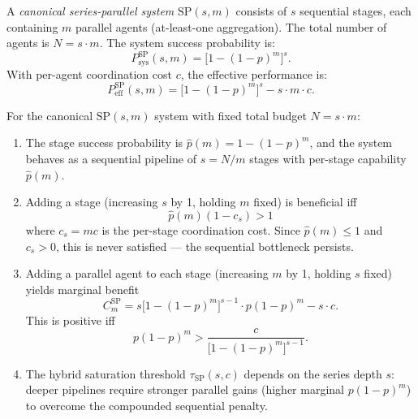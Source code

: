 \begin{definition}
\label{def:regime5-sp}
A \emph{canonical series-parallel system} $\mathrm{SP}(s, m)$ consists of $s$
sequential stages, each containing $m$ parallel agents (at-least-one aggregation).
The total number of agents is $N = s \cdot m$. The system success probability is:
\[
  P_{\mathrm{sys}}^{\mathrm{SP}}(s, m) = \bigl[1 - (1-p)^m\bigr]^s.
\]
With per-agent coordination cost $c$, the effective performance is:
\[
  P_{\mathrm{eff}}^{\mathrm{SP}}(s, m) = \bigl[1-(1-p)^m\bigr]^s - s \cdot m \cdot c.
\]
\end{definition}

\begin{theorem}
\label{thm:hybrid-saturation}
For the canonical $\mathrm{SP}(s, m)$ system with fixed total budget $N = s \cdot m$:
\begin{enumerate}
  \item The stage success probability is $\hat{p}(m) = 1 - (1-p)^m$, and the system
    behaves as a sequential pipeline of $s = N/m$ stages with per-stage capability
    $\hat{p}(m)$.

  \item Adding a stage (increasing $s$ by 1, holding $m$ fixed) is beneficial iff
    \[
      \hat{p}(m)(1-c_s) > 1
    \]
    where $c_s = mc$ is the per-stage coordination cost. Since $\hat{p}(m) \leq 1$
    and $c_s > 0$, this is never satisfied --- the sequential bottleneck persists.

  \item Adding a parallel agent to each stage (increasing $m$ by 1, holding $s$ fixed)
    yields marginal benefit
    \[
      C^{\mathrm{SP}}_m = s\bigl[1-(1-p)^m\bigr]^{s-1} \cdot p(1-p)^m - s \cdot c.
    \]
    This is positive iff
    \[
      p(1-p)^m > \frac{c}{\bigl[1-(1-p)^m\bigr]^{s-1}}.
    \]

  \item The hybrid saturation threshold $\tau_{\mathrm{SP}}(s, c)$ depends on the
    series depth $s$: deeper pipelines require stronger parallel gains (higher
    marginal $p(1-p)^m$) to overcome the compounded sequential penalty.
\end{enumerate}
\end{theorem}

